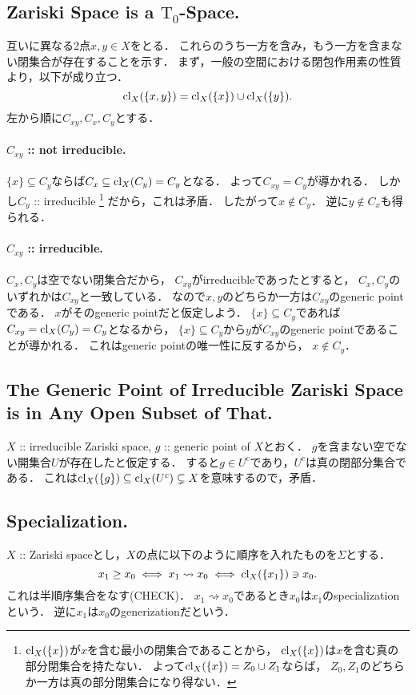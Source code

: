 \documentclass[a4paper]{jsarticle}
\begin{document}
    \subsection{Zariski Space is a $\mathrm{T_0}$-Space.}
    互いに異なる2点$x,y \in X$をとる．
    これらのうち一方を含み，もう一方を含まない閉集合が存在することを示す．
    まず，一般の空間における閉包作用素の性質より，以下が成り立つ．
    \[ \operatorname{cl}_X(\{x,y\})=\operatorname{cl}_X(\{x\}) \cup \operatorname{cl}_X(\{y\}). \]
    左から順に$C_{xy}, C_x, C_y$とする．

    \paragraph{$C_{xy}$ :: not irreducible.}
    $\{x\} \subseteq C_y$ならば$C_x \subseteq \operatorname{cl}_X(C_y)=C_y$となる．
    よって$C_{xy}=C_y$が導かれる．
    しかし$C_y$ :: irreducible
    \footnote
    {
        $\operatorname{cl}_X(\{x\})$が$x$を含む最小の閉集合であることから，
        $\operatorname{cl}_X(\{x\})$は$x$を含む真の部分閉集合を持たない．
        よって$\operatorname{cl}_X(\{x\})=Z_0 \cup Z_1$ならば，
        $Z_0, Z_1$のどちらか一方は真の部分閉集合になり得ない．
    }
    だから，これは矛盾．
    したがって$x \not \in C_y$．
    逆に$y \not \in C_x$も得られる．

    \paragraph{$C_{xy}$ :: irreducible.}
    $C_x,C_y$は空でない閉集合だから，
    $C_{xy}$がirreducibleであったとすると，
    $C_x, C_y$のいずれかは$C_{xy}$と一致している．
    なので$x,y$のどちらか一方は$C_{xy}$のgeneric pointである．
    $x$がそのgeneric pointだと仮定しよう．
    $\{x\} \subseteq C_y$であれば$C_{xy}=\operatorname{cl}_X(C_y)=C_y$となるから，
    $\{x\} \subseteq C_y$から$y$が$C_{xy}$のgeneric pointであることが導かれる．
    これはgeneric pointの唯一性に反するから，
    $x \not \in C_y$．

    \subsection{The Generic Point of Irreducible Zariski Space is in Any Open Subset of That.}
    $X$ :: irreducible Zariski space, $g$ :: generic point of $X$とおく．
    $g$を含まない空でない開集合$U$が存在したと仮定する．
    すると$g \in U^c$であり，$U^c$は真の閉部分集合である．
    これは$\operatorname{cl}_X(\{g\}) \subseteq \operatorname{cl}_X(U^c) \subsetneq X$を意味するので，矛盾．

    \subsection{Specialization.}
    $X$ :: Zariski spaceとし，$X$の点に以下のように順序を入れたものを$\Sigma$とする．
    \[ x_1 \geq x_0 \iff x_1 \rightsquigarrow x_0 \iff \operatorname{cl}_X(\{x_1\}) \ni x_0. \]
    これは半順序集合をなす(CHECK)．
    $x_1 \rightsquigarrow x_0$であるとき$x_0$は$x_1$のspecializationという．
    逆に$x_1$は$x_0$のgenerizationだという．
\end{document}
